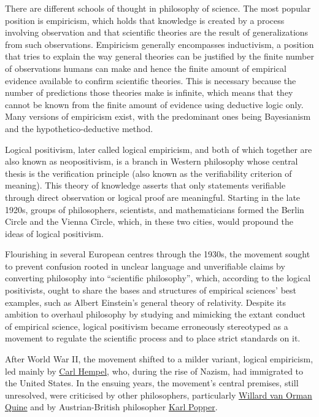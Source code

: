 There are different schools of thought in philosophy of science. The most popular position is empiricism, which holds that knowledge is created by a process involving observation and that scientific theories are the result of generalizations from such observations. Empiricism generally encompasses inductivism, a position that tries to explain the way general theories can be justified by the finite number of observations humans can make and hence the finite amount of empirical evidence available to confirm scientific theories. This is necessary because the number of predictions those theories make is infinite, which means that they cannot be known from the finite amount of evidence using deductive logic only. Many versions of empiricism exist, with the predominant ones being Bayesianism and the hypothetico-deductive method.

Logical positivism, later called logical empiricism, and both of which together are also known as neopositivism, is a branch in Western philosophy whose central thesis is the verification principle (also known as the verifiability criterion of meaning). This theory of knowledge asserts that only statements verifiable through direct observation or logical proof are meaningful. Starting in the late 1920s, groups of philosophers, scientists, and mathematicians formed the Berlin Circle and the Vienna Circle, which, in these two cities, would propound the ideas of logical positivism.

Flourishing in several European centres through the 1930s, the movement sought to prevent confusion rooted in unclear language and unverifiable claims by converting philosophy into ``scientific philosophy'', which, according to the logical positivists, ought to share the bases and structures of empirical sciences' best examples, such as Albert Einstein's general theory of relativity. Despite its ambition to overhaul philosophy by studying and mimicking the extant conduct of empirical science, logical positivism became erroneously stereotyped as a movement to regulate the scientific process and to place strict standards on it.

After World War II, the movement shifted to a milder variant, logical empiricism, led mainly by \href{https://en.wikipedia.org/wiki/Carl_Gustav_Hempel}{Carl Hempel}, who, during the rise of Nazism, had immigrated to the United States. In the ensuing years, the movement's central premises, still unresolved, were criticised by other philosophers, particularly \href{https://en.wikipedia.org/wiki/Willard_Van_Orman_Quine}{Willard van Orman Quine} and by Austrian-British philosopher \href{https://en.wikipedia.org/wiki/Karl_Popper}{Karl Popper}.

